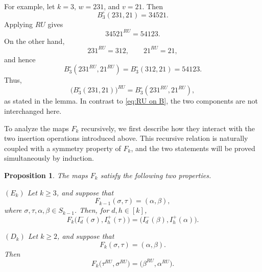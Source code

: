 \documentclass[12pt]{amsart}
\newtheorem{prop}[thm]{Proposition}
\theoremstyle{definition}
\numberwithin{equation}{section}
\begin{document}
For example, let $k=3$, $w=231$, and $v=21$. Then
\begin{equation*}
B_3^\circ(231,21)=34521.
\end{equation*}
Applying $RU$ gives
\begin{equation*}
34521^{RU}=54123.
\end{equation*}
On the other hand,
\begin{equation*}
231^{RU}=312,
\qquad
21^{RU}=21,
\end{equation*}
and hence
\begin{equation*}
B_3^\circ(231^{RU},21^{RU})
=
B_3^\circ(312,21)
=
54123.
\end{equation*}
Thus,
\begin{equation*}
\bigl(B_3^\circ(231,21)\bigr)^{RU}
=
B_3^\circ(231^{RU},21^{RU}),
\end{equation*}
as stated in the lemma. In contrast to \eqref{eq:RU on B}, the two components are not
interchanged here.

To analyze the maps $F_k$ recursively, we first describe how they
interact with the two insertion operations introduced above. This
recursive relation is naturally coupled with a symmetry property of
$F_k$, and the two statements will be proved simultaneously by
induction.

\begin{prop}\label{p:Ek Dk}
The maps $F_k$ satisfy the following two properties.

\emph{$(E_k)$} Let $k\geq 3$, and suppose that
\begin{equation*}
F_{k-1}(\sigma,\tau)=(\alpha,\beta),
\end{equation*}
where $\sigma,\tau,\alpha,\beta\in S_{k-1}$. Then, for $d,h\in[k]$,
\begin{equation*}
F_k\bigl(I_d^-(\sigma),I_h^+(\tau)\bigr)
=
\bigl(I_d^-(\beta),I_h^+(\alpha)\bigr).
\end{equation*}

\emph{$(D_k)$} Let $k\geq 2$, and suppose that
\begin{equation*}
F_k(\sigma,\tau)=(\alpha,\beta).
\end{equation*}
Then
\begin{equation*}
F_k\bigl(\tau^{RU},\sigma^{RU}\bigr)
=
\bigl(\beta^{RU},\alpha^{RU}\bigr).
\end{equation*}
\end{prop}
\end{document}
